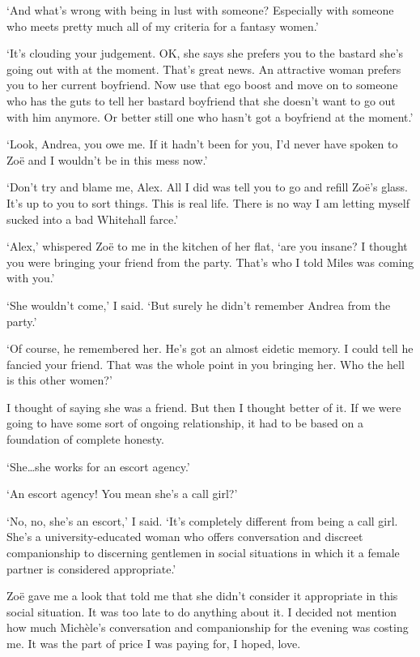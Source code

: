 `And what's wrong with being in lust with someone? Especially with
someone who meets pretty much all of my criteria for a fantasy
women.'

`It's clouding your judgement. OK, she says she prefers you to the bastard
she's going out with at the moment. That's great news. An attractive
woman prefers you to her current boyfriend. Now use that ego boost
and move on to someone who has the guts to tell her bastard
boyfriend that she doesn't want to go out with him anymore. Or
better still one who hasn't got a boyfriend at the moment.'

`Look, Andrea, you owe me. If it hadn't been for you, I'd never have
spoken to Zo{\"e} and I wouldn't be in this mess now.'

`Don't try and blame me, Alex. All I did was tell you to go and
refill Zo{\"e}'s glass. It's up to you to sort things. This is real life. There is no
way I am letting myself sucked into a bad Whitehall farce.'

`Alex,' whispered Zo{\"e} to me in the kitchen of her flat, `are you
insane? I thought you were bringing your friend from the party.
That's who I told Miles was coming with you.'

`She wouldn't come,' I said. `But surely he didn't remember Andrea
from the party.'

`Of course, he remembered her. He's got an almost eidetic memory. I
could tell he fancied your friend. That was the whole point in you
bringing her. Who the hell is this other women?'

I thought of saying she was a friend. But then I thought better of
it. If we were going to have some sort of ongoing relationship, it
had to be based on a foundation of complete honesty.

`She\dots she works for an escort agency.'

`An escort agency! You mean she's a call girl?'

`No, no, she's an escort,' I said. `It's completely different from
being a call girl. She's a university-educated woman who offers
conversation and discreet companionship to discerning gentlemen in
social situations in which it a female partner is considered
appropriate.'

Zo{\"e} gave me a look that told me that she didn't consider it
appropriate in this social situation. It was too late to do anything
about it. I decided not mention how much Mich{\`e}le's conversation
and companionship for the evening was costing me. It was the part of
price I was paying for, I hoped, love.

